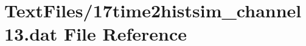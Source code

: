 \hypertarget{17time2histsim__channel13_8dat}{}\section{Text\+Files/17time2histsim\+\_\+channel13.dat File Reference}
\label{17time2histsim__channel13_8dat}
